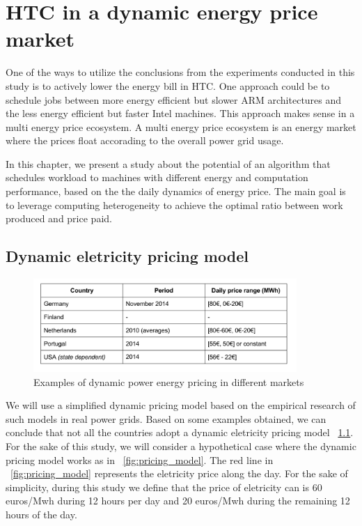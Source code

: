 \chapter{HTC in a dynamic energy price market}

One of the ways to utilize the conclusions from the experiments conducted in this study is to actively lower the energy bill in HTC. One approach could be to schedule jobs between more energy efficient but slower ARM architectures and the less energy efficient but faster Intel machines. This approach makes sense in a multi energy price ecosystem. A multi energy price ecosystem is an energy market where the prices float accorading to the overall power grid usage.

In this chapter, we present a study about the potential of an algorithm that schedules workload to machines with different energy and computation performance, based on the the daily dynamics of energy price. The main goal is to leverage computing heterogeneity to achieve the optimal ratio between work produced and price paid.  

\section{Dynamic eletricity pricing model}

\begin{figure}[hours]
  \centering
    \includegraphics[width=100mm]{"img/pricing_model_table"}
    \caption{Examples of dynamic power energy pricing in different markets}
    \label{fig:pricing_model_table}
\end{figure}

We will use a simplified dynamic pricing model based on the empirical research of such models in real power grids. Based on some examples obtained, we can conclude that not all the countries adopt a dynamic eletricity pricing model ~\ref{fig:pricing_model_table}. For the sake of this study, we will consider a hypothetical case where the dynamic pricing model works as in ~\ref{fig:pricing_model}. The red line in ~\ref{fig:pricing_model} represents the eletricity price along the day. For the sake of simplicity, during this study we define that the price of eletricity can is  60 euros/Mwh during 12 hours per day and 20 euros/Mwh during the remaining 12 hours of the day.  
	

